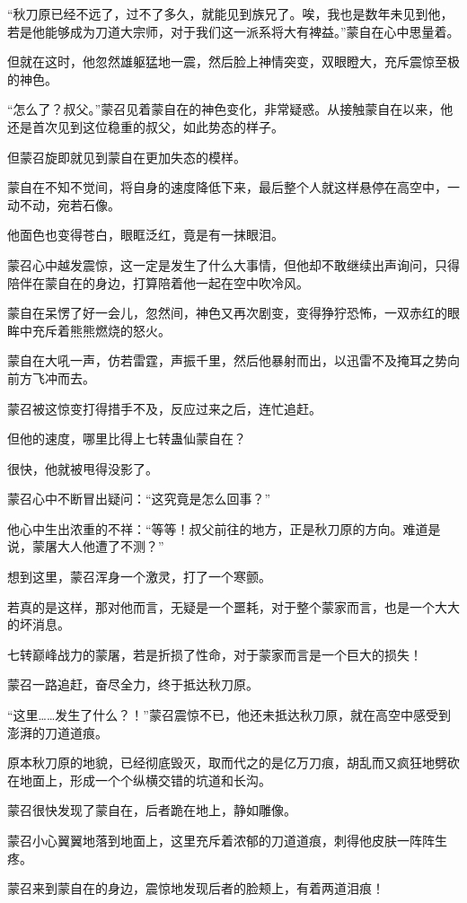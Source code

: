 \begin{this_body}
“秋刀原已经不远了，过不了多久，就能见到族兄了。唉，我也是数年未见到他，若是他能够成为刀道大宗师，对于我们这一派系将大有裨益。”蒙自在心中思量着。

但就在这时，他忽然雄躯猛地一震，然后脸上神情突变，双眼瞪大，充斥震惊至极的神色。

“怎么了？叔父。”蒙召见着蒙自在的神色变化，非常疑惑。从接触蒙自在以来，他还是首次见到这位稳重的叔父，如此势态的样子。

但蒙召旋即就见到蒙自在更加失态的模样。

蒙自在不知不觉间，将自身的速度降低下来，最后整个人就这样悬停在高空中，一动不动，宛若石像。

他面色也变得苍白，眼眶泛红，竟是有一抹眼泪。

蒙召心中越发震惊，这一定是发生了什么大事情，但他却不敢继续出声询问，只得陪伴在蒙自在的身边，打算陪着他一起在空中吹冷风。

蒙自在呆愣了好一会儿，忽然间，神色又再次剧变，变得狰狞恐怖，一双赤红的眼眸中充斥着熊熊燃烧的怒火。

蒙自在大吼一声，仿若雷霆，声振千里，然后他暴射而出，以迅雷不及掩耳之势向前方飞冲而去。

蒙召被这惊变打得措手不及，反应过来之后，连忙追赶。

但他的速度，哪里比得上七转蛊仙蒙自在？

很快，他就被甩得没影了。

蒙召心中不断冒出疑问：“这究竟是怎么回事？”

他心中生出浓重的不祥：“等等！叔父前往的地方，正是秋刀原的方向。难道是说，蒙屠大人他遭了不测？”

想到这里，蒙召浑身一个激灵，打了一个寒颤。

若真的是这样，那对他而言，无疑是一个噩耗，对于整个蒙家而言，也是一个大大的坏消息。

七转巅峰战力的蒙屠，若是折损了性命，对于蒙家而言是一个巨大的损失！

蒙召一路追赶，奋尽全力，终于抵达秋刀原。

“这里……发生了什么？！”蒙召震惊不已，他还未抵达秋刀原，就在高空中感受到澎湃的刀道道痕。

原本秋刀原的地貌，已经彻底毁灭，取而代之的是亿万刀痕，胡乱而又疯狂地劈砍在地面上，形成一个个纵横交错的坑道和长沟。

蒙召很快发现了蒙自在，后者跪在地上，静如雕像。

蒙召小心翼翼地落到地面上，这里充斥着浓郁的刀道道痕，刺得他皮肤一阵阵生疼。

蒙召来到蒙自在的身边，震惊地发现后者的脸颊上，有着两道泪痕！


\end{this_body}
